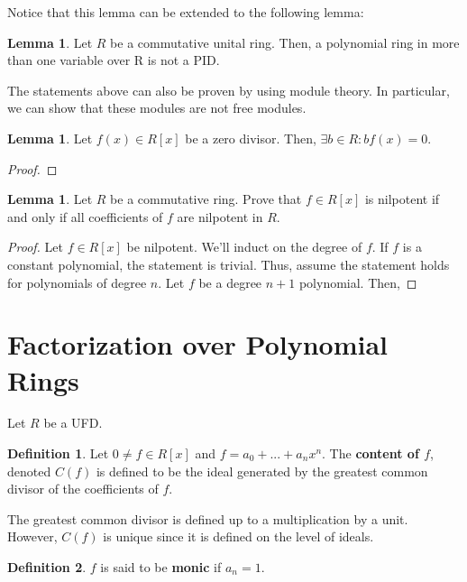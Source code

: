 \documentclass{article}
\theoremstyle{definition}
\newtheorem{definition}{Definition}
\newtheorem{lemma}[theorem]{Lemma}
\begin{document}
Notice that this lemma can be extended to the following lemma:

\begin{lemma}
    Let $R$ be a commutative unital ring. Then, a polynomial ring in more than one variable over R is not a PID.
\end{lemma}

The statements above can also be proven by using module theory. In particular, we can show
that these modules are not free modules.

\begin{lemma}
    Let $f(x) \in R[x]$ be a zero divisor. Then, $\exists b \in R: bf(x) = 0$.
\end{lemma}
\begin{proof}
    
\end{proof}

\begin{lemma}
    Let $R$ be a commutative ring. Prove that $f \in R[x]$ is nilpotent if and only if
    all coefficients of $f$ are nilpotent in $R$.
\end{lemma}
\begin{proof}
    Let $f \in R[x]$ be nilpotent. We'll induct on the degree of $f$. If $f$ is 
    a constant polynomial, the statement is trivial. Thus, assume the statement
    holds for polynomials of degree $n$. Let $f$ be a degree $n + 1$ polynomial.
    Then,

    
\end{proof}
 
\newpage

\section{Factorization over Polynomial Rings}

Let $R$ be a UFD.

\begin{definition}
    Let $0 \neq f \in R[x]$ and $f = a_{0} + ... + a_{n}x^{n}$. The \textbf{content of $f$}, denoted $C(f)$ is defined to be the ideal generated by the greatest common divisor of the coefficients of $f$.
\end{definition}

The greatest common divisor is defined up to a multiplication by a unit. However, $C(f)$ is unique since it is defined on the level of ideals.

\begin{definition}
    $f$ is said to be \textbf{monic} if $a_{n} = 1$.  
\end{definition}
\end{document}

